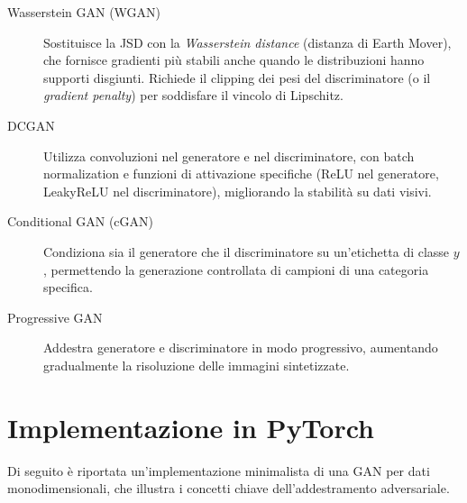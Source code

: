 \begin{description}
  \item[Wasserstein GAN (WGAN)] Sostituisce la JSD con la
        \emph{Wasserstein distance} (distanza di Earth Mover), che
        fornisce gradienti più stabili anche quando le distribuzioni
        hanno supporti disgiunti. Richiede il clipping dei pesi del
        discriminatore (o il \emph{gradient penalty}) per soddisfare
        il vincolo di Lipschitz.
  \item[DCGAN] Utilizza convoluzioni nel generatore e nel
        discriminatore, con batch normalization e funzioni di
        attivazione specifiche (ReLU nel generatore, LeakyReLU nel
        discriminatore), migliorando la stabilità su dati visivi.
  \item[Conditional GAN (cGAN)] Condiziona sia il generatore che il
        discriminatore su un'etichetta di classe $y$, permettendo la
        generazione controllata di campioni di una categoria specifica.
  \item[Progressive GAN] Addestra generatore e discriminatore in modo
        progressivo, aumentando gradualmente la risoluzione delle
        immagini sintetizzate.
\end{description}

\section{Implementazione in PyTorch}
\label{sec:gan-pytorch}

Di seguito è riportata un'implementazione minimalista di una GAN per
dati monodimensionali, che illustra i concetti chiave dell'addestramento
adversariale.

